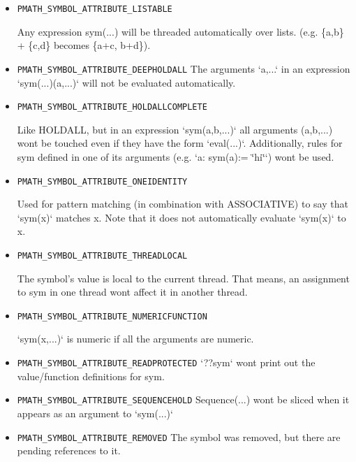 \begin{itemize}
\item {\tt PMATH\_\-SYMBOL\_\-ATTRIBUTE\_\-LISTABLE} \par
 Any expression sym(...) will be threaded automatically over lists. (e.g. \{a,b\} + \{c,d\} becomes \{a+c, b+d\}).

\item {\tt PMATH\_\-SYMBOL\_\-ATTRIBUTE\_\-DEEPHOLDALL} The arguments `a,...` in an expression `sym(...)(a,...)` will not be evaluated automatically.

\item {\tt PMATH\_\-SYMBOL\_\-ATTRIBUTE\_\-HOLDALLCOMPLETE} \par
 Like HOLDALL, but in an expression `sym(a,b,...)` all arguments (a,b,...) wont be touched even if they have the form `eval(...)`. Additionally, rules for sym defined in one of its arguments (e.g. `a: sym(a):= \char`\"{}hi\char`\"{}`) wont be used.

\item {\tt PMATH\_\-SYMBOL\_\-ATTRIBUTE\_\-ONEIDENTITY} \par
 Used for pattern matching (in combination with ASSOCIATIVE) to say that `sym(x)` matches x. Note that it does not automatically evaluate `sym(x)` to x.

\item {\tt PMATH\_\-SYMBOL\_\-ATTRIBUTE\_\-THREADLOCAL} \par
 The symbol's value is local to the current thread. That means, an assignment to sym in one thread wont affect it in another thread.

\item {\tt PMATH\_\-SYMBOL\_\-ATTRIBUTE\_\-NUMERICFUNCTION} \par
 `sym(x,...)` is numeric if all the arguments are numeric.

\item {\tt PMATH\_\-SYMBOL\_\-ATTRIBUTE\_\-READPROTECTED} `??sym` wont print out the value/function definitions for sym.

\item {\tt PMATH\_\-SYMBOL\_\-ATTRIBUTE\_\-SEQUENCEHOLD} Sequence(...) wont be sliced when it appears as an argument to `sym(...)`

\item {\tt PMATH\_\-SYMBOL\_\-ATTRIBUTE\_\-REMOVED} The symbol was removed, but there are pending references to it.

\end{itemize}


